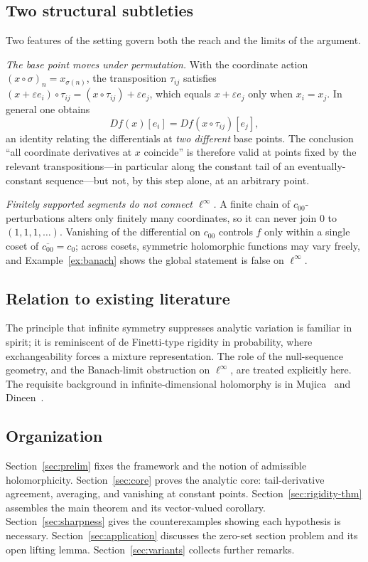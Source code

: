 \documentclass[11pt]{amsart}
\newcommand{\cc}{c_{00}}
\newcommand{\czero}{c_{0}}
\theoremstyle{plain}
\theoremstyle{definition}
\theoremstyle{remark}
\begin{document}
\subsection*{Two structural subtleties}
Two features of the setting govern both the reach and the limits of the
argument.

\emph{The base point moves under permutation.} With the coordinate action
$(x\circ\sigma)_n=x_{\sigma(n)}$, the transposition $\tau_{ij}$ satisfies
$(x+\varepsilon e_i)\circ\tau_{ij}=(x\circ\tau_{ij})+\varepsilon e_j$,
which equals $x+\varepsilon e_j$ only when $x_i=x_j$. In general one
obtains
\[
  Df(x)[e_i]=Df(x\circ\tau_{ij})[e_j],
\]
an identity relating the differentials at \emph{two different} base
points. The conclusion ``all coordinate derivatives at $x$ coincide'' is
therefore valid at points fixed by the relevant transpositions---in
particular along the constant tail of an eventually-constant sequence---but
not, by this step alone, at an arbitrary point.

\emph{Finitely supported segments do not connect $\ell^\infty$.} A finite
chain of $\cc$-perturbations alters only finitely many coordinates, so it
can never join $0$ to $(1,1,1,\ldots)$. Vanishing of the differential on
$\cc$ controls $f$ only within a single coset of $\overline{\cc}=\czero$;
across cosets, symmetric holomorphic functions may vary freely, and
Example~\ref{ex:banach} shows the global statement is false on
$\ell^\infty$.

\subsection*{Relation to existing literature}
The principle that infinite symmetry suppresses analytic variation is
familiar in spirit; it is reminiscent of de Finetti-type rigidity in
probability, where exchangeability forces a mixture representation. The
role of the null-sequence geometry, and the Banach-limit obstruction on
$\ell^\infty$, are treated explicitly here.
The requisite background in infinite-dimensional holomorphy is in
Mujica~\cite{Mujica} and Dineen~\cite{Dineen}.

\subsection*{Organization}
Section~\ref{sec:prelim} fixes the framework and the notion of admissible
holomorphicity. Section~\ref{sec:core} proves the analytic core:
tail-derivative agreement, averaging, and vanishing at constant points.
Section~\ref{sec:rigidity-thm} assembles the main theorem and its
vector-valued corollary. Section~\ref{sec:sharpness} gives the
counterexamples showing each hypothesis is necessary.
Section~\ref{sec:application} discusses the zero-set section problem and its
open lifting lemma. Section~\ref{sec:variants} collects further remarks.
\end{document}
